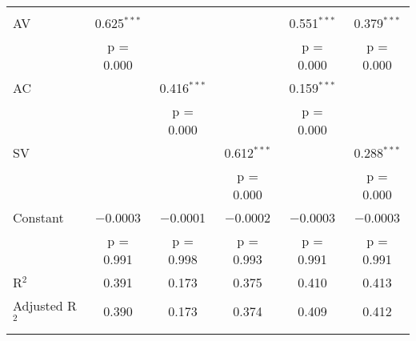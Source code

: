 
\begin{tabular}{@{\extracolsep{5pt}}lccccc} 
\\[-1.8ex]
\hline \\[-1.8ex] 
 AV & 0.625$^{***}$ &  &  & 0.551$^{***}$ & 0.379$^{***}$ \\ 
  & p = 0.000 &  &  & p = 0.000 & p = 0.000 \\ 
 AC &  & 0.416$^{***}$ &  & 0.159$^{***}$ &  \\ 
  &  & p = 0.000 &  & p = 0.000 &  \\ 
 SV &  &  & 0.612$^{***}$ &  & 0.288$^{***}$ \\ 
  &  &  & p = 0.000 &  & p = 0.000 \\ 
 Constant & $-$0.0003 & $-$0.0001 & $-$0.0002 & $-$0.0003 & $-$0.0003 \\ 
  & p = 0.991 & p = 0.998 & p = 0.993 & p = 0.991 & p = 0.991 \\ 
R$^{2}$ & 0.391 & 0.173 & 0.375 & 0.410 & 0.413 \\ 
Adjusted R$^{2}$ & 0.390 & 0.173 & 0.374 & 0.409 & 0.412 \\ 
\hline \\[-1.8ex] 
\end{tabular} 
